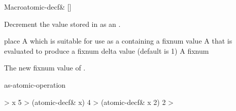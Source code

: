 \begin{functiondoc}{Macro}{atomic-decf\&}{
    []
    \returns{} }
%

\fnsyntax \fnpurpose Decrement the  value stored in
 as an .

\fnpackage {}

\fnmodule {}

\fnargs
\begin{args}{place}
\arg[place] A  which is suitable for use as a
 containing a fixnum value
 A  that is evaluated to produce a fixnum delta
value (default is 1)
 A fixnum
\end{args}

\fnreturns The new fixnum value of . 

\begin{alsos}{as-atomic-operation}
\end{alsos}

\fnexamples
%
\W\supp
\begin{example}
  > x
  5
  > (atomic-decf\& x)
  4
  > (atomic-decf\& x 2)
  2
  >
\end{example}

\end{functiondoc}


